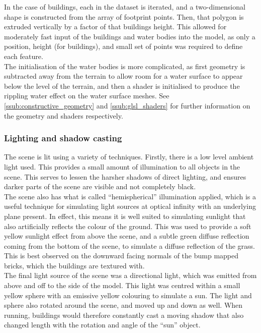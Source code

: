             In the case of buildings, each in the dataset is iterated, and a two-dimensional shape is constructed from the array of footprint points.
            Then, that polygon is extruded vertically by a factor of that buildings height.
            This allowed for moderately fast input of the buildings and water bodies into the model, as only a position, height (for buildings), and small set of points was required to define each feature.\\

            The initialisation of the water bodies is more complicated, as first geometry is subtracted away from the terrain to allow room for a water surface to appear below the level of the terrain, and then a shader is initialised to produce the rippling water effect on the water surface meshes. See \ref{ssub:constructive_geometry} and \ref{ssub:glsl_shaders} for further information on the geometry and shaders respectively.


        \subsubsection{Lighting and shadow casting} %
        \label{ssub:lighting_and_shadow_casting}
            The scene is lit using a variety of techniques.
            Firstly, there is a low level ambient light used.
            This provides a small amount of illumination to all objects in the scene.
            This serves to lessen the harsher shadows of direct lighting, and ensures darker parts of the scene are visible and not completely black.\\

            The scene also has what is called ``hemispherical'' illumination applied, which is a useful technique for simulating light sources at optical infinity with an underlying plane present.
            In effect, this means it is well suited to simulating sunlight that also artificially reflects the colour of the ground.
            This was used to provide a soft yellow sunlight effect from above the scene, and a subtle green diffuse reflection coming from the bottom of the scene, to simulate a diffuse reflection of the grass.
            This is best observed on the downward facing normals of the bump mapped bricks, which the buildings are textured with.\\

            The final light source of the scene was a directional light, which was emitted from above and off to the side of the model.
            This light was centred within a small yellow sphere with an emissive yellow colouring to simulate a sun.
            The light and sphere also rotated around the scene, and moved up and down as well.
            When running, buildings would therefore constantly cast a moving shadow that also changed length with the rotation and angle of the ``sun'' object.

